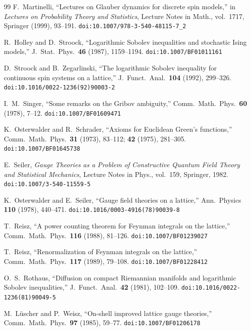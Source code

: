 \documentclass[11pt,a4paper]{article}
\theoremstyle{plain}
\theoremstyle{definition}
\theoremstyle{remark}
\begin{document}
\begin{thebibliography}{99}
 F.~Martinelli,
  ``Lectures on Glauber dynamics for discrete spin
  models,''
  in \emph{Lectures on Probability Theory and Statistics},
  Lecture Notes in Math., vol.~1717, Springer (1999),
  93--191.
  \texttt{doi:10.1007/978-3-540-48115-7\_2}

 R.~Holley and D.~Stroock,
  ``Logarithmic Sobolev inequalities and stochastic
  Ising models,''
  J.~Stat.\ Phys.\ \textbf{46} (1987), 1159--1194.
  \texttt{doi:10.1007/BF01011161}

 D.~Stroock and
  B.~Zegarlinski,
  ``The logarithmic Sobolev inequality for continuous
  spin systems on a lattice,''
  J.~Funct.\ Anal.\ \textbf{104} (1992), 299--326.
  \texttt{doi:10.1016/0022-1236(92)90003-2}

 I.~M.~Singer,
  ``Some remarks on the Gribov ambiguity,''
  Comm.\ Math.\ Phys.\ \textbf{60} (1978), 7--12.
  \texttt{doi:10.1007/BF01609471}

 K.~Osterwalder and
  R.~Schrader,
  ``Axioms for Euclidean Green's functions,''
  Comm.\ Math.\ Phys.\ \textbf{31} (1973), 83--112;
  \textbf{42} (1975), 281--305.
  \texttt{doi:10.1007/BF01645738}

 E.~Seiler,
  \emph{Gauge Theories as a Problem of Constructive
  Quantum Field Theory and Statistical Mechanics},
  Lecture Notes in Phys., vol.~159, Springer, 1982.
  \texttt{doi:10.1007/3-540-11559-5}

 K.~Osterwalder and
  E.~Seiler,
  ``Gauge field theories on a lattice,''
  Ann.\ Physics \textbf{110} (1978), 440--471.
  \texttt{doi:10.1016/0003-4916(78)90039-8}

 T.~Reisz,
  ``A power counting theorem for Feynman integrals
  on the lattice,''
  Comm.\ Math.\ Phys.\ \textbf{116} (1988), 81--126.
  \texttt{doi:10.1007/BF01239027}

 T.~Reisz,
  ``Renormalization of Feynman integrals on the lattice,''
  Comm.\ Math.\ Phys.\ \textbf{117} (1989), 79--108.
  \texttt{doi:10.1007/BF01228412}

 O.~S.~Rothaus,
  ``Diffusion on compact Riemannian manifolds and
  logarithmic Sobolev inequalities,''
  J.~Funct.\ Anal.\ \textbf{42} (1981), 102--109.
  \texttt{doi:10.1016/0022-1236(81)90049-5}

 M.~L\"uscher and P.~Weisz,
  ``On-shell improved lattice gauge theories,''
  Comm.\ Math.\ Phys.\ \textbf{97} (1985), 59--77.
  \texttt{doi:10.1007/BF01206178}


\end{thebibliography}
\end{document}
